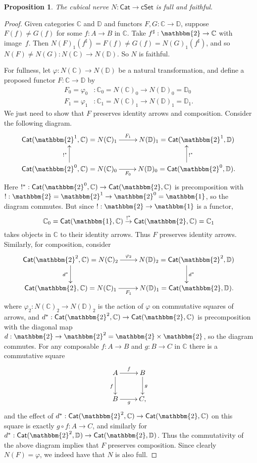 \documentclass[11pt,reqno]{amsart}
\newcommand{\bbtwo}{\ensuremath{\mathbbm{2}}}
\newcommand{\D}{\ensuremath{\mathbb{D}}}
\newcommand{\bbC}{\ensuremath{\mathbb{C}}}
\newcommand{\Cat}{\ensuremath{\mathsf{Cat}}}
\newcommand{\cSet}{\ensuremath{\mathsf{cSet}}}
\renewcommand{\to}{\ensuremath{\rightarrow}}
\newtheorem{proposition}[theorem]{Proposition}
\theoremstyle{remark}
\theoremstyle{definition}
\begin{document}
\begin{proposition}\label{prop:nervefull}
The cubical nerve $N : \Cat \to \cSet$ is full and faithful.
\end{proposition}
\begin{proof}
Given categories $\bbC$ and $\D$ and functors $F, G : \bbC\to\D$, suppose $F(f) \neq G(f)$ for some $f : A\to B$ in $\bbC$.  Take $f^{\sharp} : \bbtwo \to \bbC$ with image~$f$.  Then $N(F)_1(f^\sharp) = F(f) \neq G(f) = N(G)_1(f^\sharp)$, and so $N(F) \neq N(G) : N(\bbC)\to N(\D)$.  So $N$ is faithful.

For fullness, let $\varphi : N(\bbC) \to N(\D)$ be a natural transformation, and define a proposed functor $F : \bbC\to \D$ by  
\begin{align*}
F_0 = \varphi_0 &: \bbC_0 = N(\bbC)_0 \to N(\D)_0 = \D_0\\
F_1 = \varphi_1 &: \bbC_1 = N(\bbC)_1 \to N(\D)_1 = \D_1.
 \end{align*}
We just need to show that $F$ preserves identity arrows and composition.
Consider the following diagram.
\[
\xymatrix{
\Cat(\bbtwo^1, \bbC) = N(\bbC)_1 \ar[r]^{F_1} & N(\D)_1 = \Cat(\bbtwo^1, \D) \\
\Cat(\bbtwo^0, \bbC) = N(\bbC)_0 \ar[u]^{!^*} \ar[r]_{F_0} & N(\D)_0 = \Cat(\bbtwo^0, \D) \ar[u]_{!^*}.
}
\]
Here $!^* : \Cat(\bbtwo^0, \bbC) \to \Cat(\bbtwo, \bbC) $ is precomposition with $! : \bbtwo = \bbtwo^1 \rightarrow \bbtwo^0 = \mathbbm{1}$, so the diagram commutes.  But since $! : \bbtwo \rightarrow \mathbbm{1}$ is a functor, 
\[
\bbC_0 = \Cat(\mathbbm{1}, \bbC)  \stackrel{!^*}{\to}  \Cat(\bbtwo, \bbC) = \bbC_1
\]
 takes objects in $\bbC$ to their identity arrows.  Thus $F$ preserves identity arrows.  Similarly, for composition, consider 
\[
\xymatrix{
\Cat(\bbtwo^2, \bbC) = N(\bbC)_2 \ar[d]_{d^*} \ar[r]^{\varphi_2} & N(\D)_2 = \Cat(\bbtwo^2, \D) \ar[d]^{d^*} \\
\Cat(\bbtwo, \bbC) = N(\bbC)_1  \ar[r]_{F_1} & N(\D)_1 = \Cat(\bbtwo, \D).
}
\]
where $\varphi_2 : N(\bbC)_2 \to N(\D)_2$ is the action of $\varphi$ on commutative squares of arrows, and $d^* : \Cat(\bbtwo^2, \bbC) \to \Cat(\bbtwo, \bbC)$ is precomposition with the diagonal map $d : \bbtwo \rightarrow \bbtwo^2 = \bbtwo\times\bbtwo$, so the diagram commutes.  For any composable $f: A \to B$ and $g:B\to C$ in $\bbC$ there is a commutative square 
\[
\xymatrix{
A \ar[r]^{f} \ar[d]_{f} & B \ar[d]^{g} \\
B  \ar[r]_{g} & C,
}
\]
and the effect of $d^* : \Cat(\bbtwo^2, \bbC) \to \Cat(\bbtwo, \bbC)$ on this square is exactly $g\circ f: A\to C$, and similarly for $d^* : \Cat(\bbtwo^2, \D) \to \Cat(\bbtwo, \D)$.  Thus the commutativity of the above diagram implies that $F$ preserves composition.
Since clearly $N(F) = \varphi$, we indeed have that $N$ is also full.
\end{proof}





\end{document}
